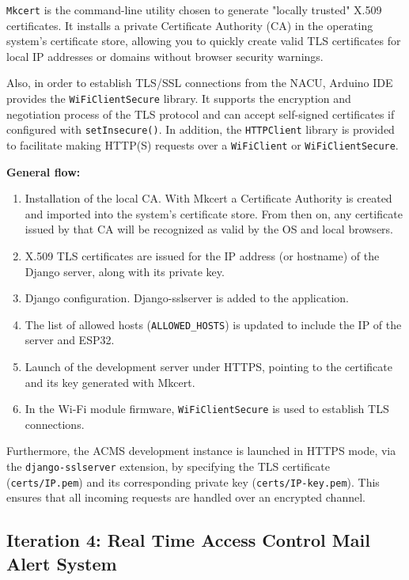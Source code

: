 \texttt{Mkcert} \cite{Ref48} is the command-line utility chosen to generate "locally trusted" X.509 certificates. It installs a private Certificate Authority (CA) in the operating system's certificate store, allowing you to quickly create valid TLS certificates for local IP addresses or domains without browser security warnings.

Also, in order to establish TLS/SSL connections from the NACU, Arduino IDE provides the \texttt{WiFiClientSecure} \cite{Ref49} library. It supports the encryption and negotiation process of the TLS protocol and can accept self-signed certificates if configured with \texttt{setInsecure()}. In addition, the \texttt{HTTPClient} \cite{Ref50} library is provided to facilitate making HTTP(S) requests over a \texttt{WiFiClient} or \texttt{WiFiClientSecure}.

\textbf{General flow:}
\begin{enumerate}
	\item Installation of the local CA. With Mkcert a Certificate Authority is created and imported into the system's certificate store. From then on, any certificate issued by that CA will be recognized as valid by the OS and local browsers.
	\item X.509 TLS \cite{Ref77} certificates are issued for the IP address (or hostname) of the Django server, along with its private key.
	\item Django configuration. Django-sslserver is added to the application.
	\item The list of allowed hosts (\texttt{ALLOWED\_HOSTS}) is updated to include the IP of the server and ESP32.
	\item Launch of the development server under HTTPS, pointing to the certificate and its key generated with Mkcert.
	\item In the Wi-Fi module firmware, \texttt{WiFiClientSecure} is used to establish TLS connections.
\end{enumerate}

Furthermore, the ACMS development instance is launched in HTTPS mode, via the \texttt{django-sslserver} extension, by specifying the TLS certificate (\texttt{certs/IP.pem}) and its corresponding private key (\texttt{certs/IP-key.pem}). This ensures that all incoming requests are handled over an encrypted channel.

\subsection{Iteration 4: Real Time Access Control Mail Alert System}
\label{subsec:email}

